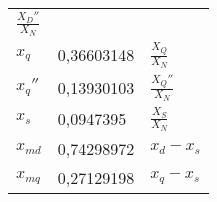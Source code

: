 \begin{longtable}[]{@{}lll@{}}
\begin{minipage}[t]{0.55\columnwidth}
\(\frac{X_D''}{X_N}\)\strut
\end{minipage}\tabularnewline
\begin{minipage}[t]{0.10\columnwidth}\raggedright
\(x_q\)\strut
\end{minipage} & \begin{minipage}[t]{0.25\columnwidth}\raggedright
0,36603148\strut
\end{minipage} & \begin{minipage}[t]{0.55\columnwidth}\raggedright
\(\frac{X_Q}{X_N}\)\strut
\end{minipage}\tabularnewline
\begin{minipage}[t]{0.10\columnwidth}\raggedright
\(x_q''\)\strut
\end{minipage} & \begin{minipage}[t]{0.25\columnwidth}\raggedright
0,13930103\strut
\end{minipage} & \begin{minipage}[t]{0.55\columnwidth}\raggedright
\(\frac{X_Q''}{X_N}\)\strut
\end{minipage}\tabularnewline
\begin{minipage}[t]{0.10\columnwidth}\raggedright
\(x_s\)\strut
\end{minipage} & \begin{minipage}[t]{0.25\columnwidth}\raggedright
0,0947395\strut
\end{minipage} & \begin{minipage}[t]{0.55\columnwidth}\raggedright
\(\frac{X_S}{X_N}\)\strut
\end{minipage}\tabularnewline
\begin{minipage}[t]{0.10\columnwidth}\raggedright
\(x_{md}\)\strut
\end{minipage} & \begin{minipage}[t]{0.25\columnwidth}\raggedright
0,74298972\strut
\end{minipage} & \begin{minipage}[t]{0.55\columnwidth}\raggedright
\(x_d-x_s\)\strut
\end{minipage}\tabularnewline
\begin{minipage}[t]{0.10\columnwidth}\raggedright
\(x_{mq}\)\strut
\end{minipage} & \begin{minipage}[t]{0.25\columnwidth}\raggedright
0,27129198\strut
\end{minipage} & \begin{minipage}[t]{0.55\columnwidth}\raggedright
\(x_q-x_s\)\strut
\end{minipage}\tabularnewline

\end{longtable}
